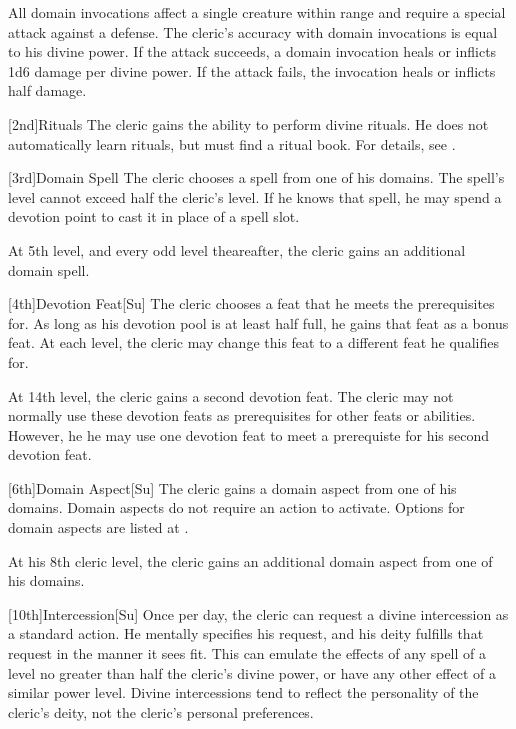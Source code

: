         All domain invocations affect a single creature within \rngmed range and require a special attack against a defense.
        The cleric's accuracy with domain invocations is equal to his divine power.
        If the attack succeeds, a domain invocation heals or inflicts 1d6 damage per divine power.
        If the attack fails, the invocation heals or inflicts half damage.

        [2nd]{Rituals}
        The cleric gains the ability to perform divine rituals.
        He does not automatically learn rituals, but must find a ritual book.
        For details, see .

        [3rd]{Domain Spell}
        The cleric chooses a spell from one of his domains.
        The spell's level cannot exceed half the cleric's level.
        If he knows that spell, he may spend a devotion point to cast it in place of a spell slot.

        At 5th level, and every odd level theareafter, the cleric gains an additional domain spell.

        [4th]{Devotion Feat}[Su]
        The cleric chooses a feat that he meets the prerequisites for.
        As long as his devotion pool is at least half full, he gains that feat as a bonus feat.
        At each level, the cleric may change this feat to a different feat he qualifies for.

        At 14th level, the cleric gains a second devotion feat.
        The cleric may not normally use these devotion feats as prerequisites for other feats or abilities.
        However, he he may use one devotion feat to meet a prerequiste for his second devotion feat.

        [6th]{Domain Aspect}[Su]
        The cleric gains a domain aspect from one of his domains.
        Domain aspects do not require an action to activate.
        Options for domain aspects are listed at .

        At his 8th cleric level, the cleric gains an additional domain aspect from one of his domains.

        [10th]{Intercession}[Su]
        Once per day, the cleric can request a divine intercession as a standard action.
        He mentally specifies his request, and his deity fulfills that request in the manner it sees fit.
        This can emulate the effects of any spell of a level no greater than half the cleric's divine power, or have any other effect of a similar power level.
        Divine intercessions tend to reflect the personality of the cleric's deity, not the cleric's personal preferences.

